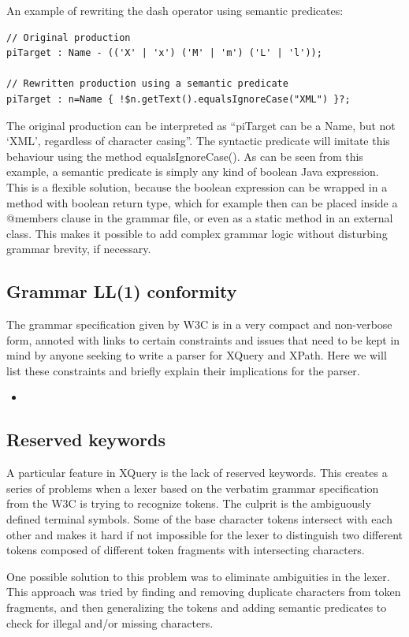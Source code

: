 An example of rewriting the dash operator using semantic predicates:
\begin{verbatim}
// Original production
piTarget : Name - (('X' | 'x') ('M' | 'm') ('L' | 'l'));

// Rewritten production using a semantic predicate
piTarget : n=Name { !$n.getText().equalsIgnoreCase("XML") }?;
\end{verbatim}
The original production can be interpreted as ``piTarget can be a Name, but not
`XML', regardless of character casing''. The syntactic predicate will imitate
this behaviour using the method equalsIgnoreCase(). As can be seen from this
example, a semantic predicate is simply any kind of boolean Java expression.
This is a flexible solution, because the boolean expression can be wrapped in a
method with boolean return type, which for example then can be placed inside a
@members { } clause in the grammar file, or even as a static method in an
external class. This makes it possible to add complex grammar logic without
disturbing grammar brevity, if necessary.

\subsection{Grammar LL(1) conformity}
The grammar specification given by W3C is in a very compact and non-verbose
form, annoted with links to certain constraints and issues that need to be kept
in mind by anyone seeking to write a parser for XQuery and XPath. Here we will
list these constraints and briefly explain their implications for the parser.

\begin{itemize}
  \item 
\end{itemize}

\subsection{Reserved keywords}
A particular feature in XQuery is the lack of reserved keywords. This creates a
series of problems when a lexer based on the verbatim grammar specification from
the W3C is trying to recognize tokens. The culprit is the ambiguously defined
terminal symbols. Some of the base character tokens intersect with each other
and makes it hard if not impossible for the lexer to distinguish two different
tokens composed of different token fragments with intersecting characters.

One possible solution to this problem was to eliminate ambiguities in the lexer.
This approach was tried by finding and removing duplicate characters from token
fragments, and then generalizing the tokens and adding semantic predicates to
check for illegal and/or missing characters.


